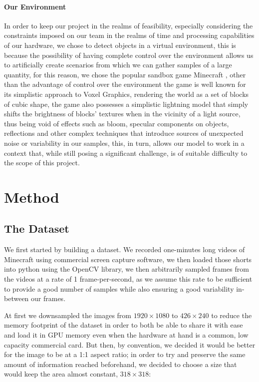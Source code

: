 \documentclass[10pt,journal,cspaper,compsoc]{IEEEtran}
\begin{document}
    \paragraph*{Our Environment}
    In order to keep our project in the realms of feasibility, especially considering the constraints imposed on our team in the 
    realms of time and processing capabilities of our hardware, we chose to detect objects in a virtual environment, this is because 
    the possibility of having complete control over the environment allows us to artificially create scenarios from which we can gather 
    samples of a large quantity, for this reason, we chose the popular sandbox game Minecraft \cite{Mojang-Minecraft}, other than 
    the advantage of control over the environment the game is well known for its simplistic approach to Voxel Graphics, rendering 
    the world as a set of blocks of cubic shape, the game also possesses a simplistic lightning model that simply shifts the brightness
    of blocks' textures when in the vicinity of a light source, thus being void of effects such as bloom, specular components on objects,
    reflections and other complex techniques that introduce sources of unexpected noise or variability in our samples, this, in turn, 
    allows our model to work in a context that, while still posing a significant challenge, is of suitable difficulty to the scope of 
    this project.



 \section{Method}   
    \subsection{The Dataset}
    We first started by building a dataset. We recorded one-minutes long videos of Minecraft using commercial screen capture software, we then loaded those shorts into python using the OpenCV library, we then arbitrarily sampled frames from the videos at a rate of 1 frame-per-second, as we assume this rate to be sufficient to provide a good number of samples while also ensuring a good variability in-between our frames. 

    At first we downsampled the images from $1920\times 1080$ to $426 \times 240$ to reduce the memory footprint of the dataset in order to both be able to share it with ease and load it in GPU memory even when the hardware at hand is a common, low capacity commercial card. But then, by convention, we decided it would be better for the image to be at a 1:1 aspect ratio; in order to try and preserve the same amount of information reached beforehand, we decided to choose a size that would keep the area almost constant, $318\times 318$:
\end{document}
